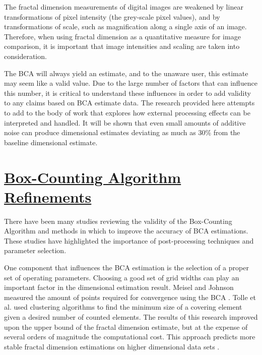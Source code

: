\documentclass[12pt, oneside]{book}
\begin{document}
The fractal dimension measurements of digital images are weakened by linear transformations of pixel intensity (the grey-scale pixel values), and by transformations of scale, such as magnification along a single axis of an image.  Therefore, when using fractal dimension as a quantitative measure for image comparison, it is important that image intensities and scaling are taken into consideration. \cite{soille_validity_1996}

The BCA will always yield an estimate, and to the unaware user, this estimate may seem like a valid value.  Due to the large number of factors that can influence this number, it is critical to understand these influences in order to add validity to any claims based on BCA estimate data.  The research provided here attempts to add to the body of work that explores how external processing effects can be interpreted and handled.  It will be shown that even small amounts of additive noise can produce dimensional estimates deviating as much as 30\% from the baseline dimensional estimate.

\section{\underline{Box-Counting Algorithm Refinements}}
There have been many studies reviewing the validity of the Box-Counting Algorithm and methods in which to improve the accuracy of BCA estimations.  These studies have highlighted the importance of post-processing techniques and parameter selection.

One component that influences the BCA estimation is the selection of a proper set of operating parameters.  Choosing a good set of grid widths can play an important factor in the dimensional estimation result.  Meisel and Johnson measured the amount of points required for convergence using the BCA \cite{meisel_convergence_1997}.  Tolle et al. used clustering algorithms to find the minimum size of a covering element given a desired number of counted elements.  The results of this research improved upon the upper bound of the fractal dimension estimate, but at the expense of several orders of magnitude the computational cost.  This approach predicts more stable fractal dimension estimations on higher dimensional data sets \cite{tolle_suboptimal_2003}.
\end{document}

